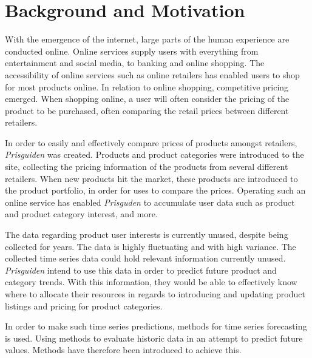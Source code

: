 
\section{Background and Motivation}\label{cit}
\label{section:Introduction:BackgroundAndMotivation}


With the emergence of the internet, large parts of the human experience are conducted online.
Online services supply users with everything from entertainment and social media, to banking and online shopping.
The accessibility of online services such as online retailers has enabled users to shop for most products online.
In relation to online shopping, competitive pricing emerged.
When shopping online, a user will often consider the pricing of the product to be purchased, often comparing the retail prices between different retailers.


In order to easily and effectively compare prices of products amongst retailers, 
\textit{Prisguiden} was created.
Products and product categories were introduced to the site, collecting the pricing information of the products from several different retailers.
When new products hit the market, these products are introduced to the product portfolio, in order for uses to compare the prices.
Operating such an online service has enabled \textit{Prisguden} to accumulate user data such as product and product category interest, and more.

The data regarding product user interests is currently unused, despite being collected for years.
The data is highly fluctuating and with high variance.
The collected time series data could hold relevant information currently unused.
\textit{Prisguiden} intend to use this data in order to predict future product and category trends.
With this information, they would be able to effectively know where to allocate their resources in regards to introducing and updating product listings and pricing for product categories.
\linebreak


In order to make such time series predictions, methods for time series forecasting is used.
Using methods to evaluate historic data in an attempt to predict future values.
Methods have therefore been introduced to achieve this.


